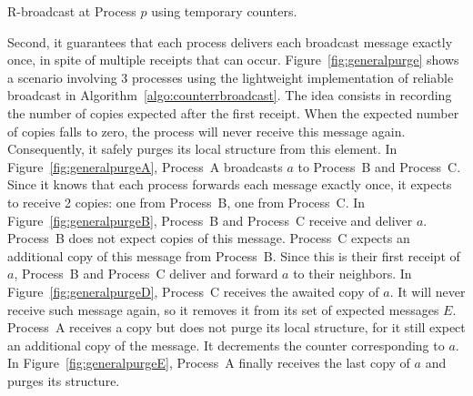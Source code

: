 \begin{algorithm}
  
  \caption{\label{algo:counterrbroadcast}R-broadcast at Process $p$ using
    temporary counters.}
\end{algorithm}


Second, it guarantees that each process delivers each broadcast message exactly
once, in spite of multiple receipts that can occur.
Figure~\ref{fig:generalpurge} shows a scenario involving 3 processes using the
lightweight implementation of reliable broadcast in
Algorithm~\ref{algo:counterrbroadcast}.  The idea consists in recording the
number of copies expected after the first receipt. When the expected number of
copies falls to zero, the process will never receive this message
again. Consequently, it safely purges its local structure from this element. In
Figure~\ref{fig:generalpurgeA}, Process~A broadcasts $a$ to Process~B and
Process~C. Since it knows that each process forwards each message exactly once,
it expects to receive 2 copies: one from Process~B, one from Process~C. In
Figure~\ref{fig:generalpurgeB}, Process~B and Process~C receive and deliver
$a$. Process~B does not expect copies of this message. Process~C expects an
additional copy of this message from Process~B.  Since this is their first
receipt of $a$, Process~B and Process~C deliver and forward $a$ to their
neighbors. In Figure~\ref{fig:generalpurgeD}, Process~C receives the awaited
copy of $a$. It will never receive such message again, so it removes it from its
set of expected messages $E$. Process~A receives a copy but does not purge its
local structure, for it still expect an additional copy of the message. It
decrements the counter corresponding to $a$. In Figure~\ref{fig:generalpurgeE},
Process~A finally receives the last copy of $a$ and purges its structure.

